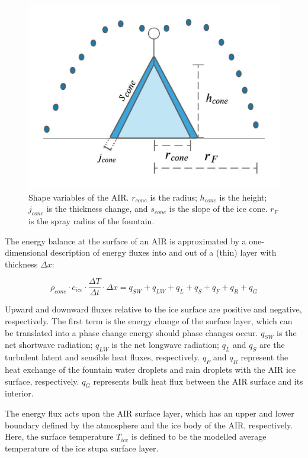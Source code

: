 \begin{figure}
	\begin{center}
		\includegraphics[width=10 cm]{figs/AIR_schematic.jpeg}
	\end{center}
	\caption{Shape variables of the AIR. $r_{cone}$ is the radius; $h_{cone}$ is the height; $j_{cone}$ is the
		thickness change, and $s_{cone}$ is the slope of the ice cone. $r_F$ is the spray radius of the fountain.}
	\label{fig:shape}
\end{figure}

The energy balance at the surface of an AIR is approximated by a one-dimensional description of energy fluxes
into and out of a (thin) layer with thickness $\Delta x$:

\begin{equation}
	\rho_{cone} \cdot c_{ice} \cdot \frac{\Delta T}{\Delta t} \cdot \Delta x = q_{SW} + q_{LW} + q_{L} + q_{S} + q_{F}+ q_{R} + q_{G}
	\label{eqn:EB}
\end{equation}

Upward and downward fluxes relative to the ice surface are positive and negative, respectively. The first term
is the energy change of the surface layer, which can be translated into a phase change energy should phase
changes occur. $q_{SW}$ is the net shortwave radiation; $q_{LW}$ is the net longwave radiation; $q_{L}$ and
$q_{S}$ are the turbulent latent and sensible heat fluxes, respectively. $q_{F}$ and $q_{R}$ represent the heat exchange of
the fountain water droplets and rain droplets with the AIR ice surface, respectively. $q_{G}$ represents bulk
heat flux between the AIR surface and its interior.

The energy flux acts upon the AIR surface layer, which has an upper and lower boundary defined by the atmosphere
and the ice body of the AIR, respectively. Here, the surface temperature $T_{ice}$ is defined to be the modelled
average temperature of the ice stupa surface layer.

